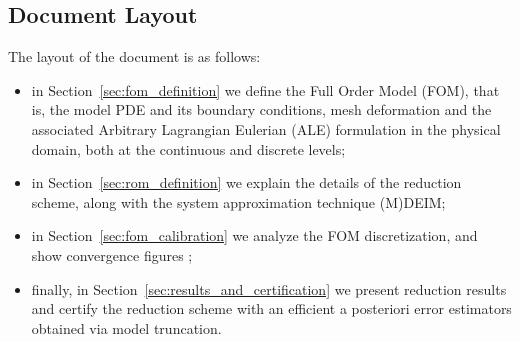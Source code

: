\documentclass[thesis.tex]{subfiles}
\begin{document}
\subsection{Document Layout}
The layout of the document is as follows:
\begin{itemize}
    \item in Section~\ref{sec:fom_definition} we define the Full Order Model (FOM), that is, 
    the model PDE and its boundary conditions, 
    mesh deformation and the associated Arbitrary Lagrangian Eulerian (ALE) formulation
    in the physical domain,
    both at the continuous and discrete levels;
    \item in Section~\ref{sec:rom_definition} we explain the details of the reduction scheme, 
    along with the system approximation technique (M)DEIM;
    \item in Section~\ref{sec:fom_calibration} we analyze the FOM discretization, 
    and show convergence figures 
    ;
    \item finally, in Section~\ref{sec:results_and_certification} we present reduction results
    and certify the reduction scheme with an efficient a posteriori error estimators obtained via model truncation.
\end{itemize}
\end{document}
